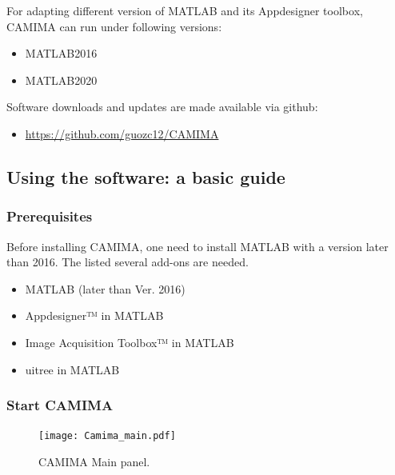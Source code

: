 For adapting different version of MATLAB and its Appdesigner toolbox, CAMIMA can run under following versions:
\begin{itemize}[noitemsep,topsep=0pt]
\item MATLAB2016
\item MATLAB2020
\end{itemize}

Software downloads and updates are made available via github:
\begin{itemize}[noitemsep,topsep=0pt]
\item \href{https://github.com/guozc12/CAMIMA}{https://github.com/guozc12/CAMIMA}
\end{itemize}

\subsection{Using the software: a basic guide}
\subsubsection{Prerequisites}
Before installing CAMIMA, one need to install MATLAB with a version later than 2016. The listed several add-ons are needed.
\begin{itemize}[noitemsep,topsep=0pt]
    \item MATLAB (later than Ver. 2016)
    \item Appdesigner™ in MATLAB
    \item Image Acquisition Toolbox™ in MATLAB
    \item uitree in MATLAB
\end{itemize}

\subsubsection{Start CAMIMA}
\begin{figure}[htb]
\begin{center}
\texttt{[image: Camima\_main.pdf]}
\end{center}
\caption[CAMIMA main panel]{CAMIMA Main panel.}
\label{Camima_main}
\end{figure}

